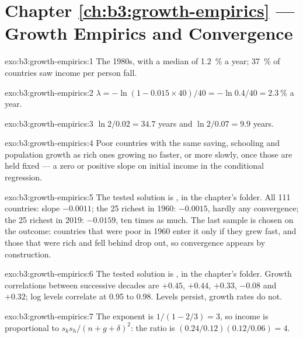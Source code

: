 \section*{Chapter \ref{ch:b3:growth-empirics} --- Growth Empirics and Convergence}

\begin{solution}{exo:b3:growth-empirics:1}
The 1980s, with a median of 1.2~\% a year; 37~\% of countries saw income per person fall. %
\end{solution}

\begin{solution}{exo:b3:growth-empirics:2}
$\lambda = -\ln(1 - 0.015 \times 40)/40 = -\ln 0.4/40 = 2.3~\%$ a year.
\end{solution}

\begin{solution}{exo:b3:growth-empirics:3}
$\ln 2/0.02 = 34.7$ years and $\ln 2/0.07 = 9.9$ years.
\end{solution}

\begin{solution}{exo:b3:growth-empirics:4}
Poor countries with the same saving, schooling and population growth as rich ones
growing no faster, or more slowly, once those are held fixed --- a zero or positive
slope on initial income in the conditional regression.
\end{solution}

\begin{solution}{exo:b3:growth-empirics:5}
The tested solution is , in the chapter's 
folder. All 111 countries: slope $-0.0011$; the 25 richest in 1960: $-0.0015$, hardly any
convergence; the 25 richest in 2019: $-0.0159$, ten times as much. The last sample is chosen on the outcome: countries that were poor in 1960
enter it only if they grew fast, and those that were rich and fell behind drop out,
so convergence appears by construction.
\end{solution}

\begin{solution}{exo:b3:growth-empirics:6}
The tested solution is , in the chapter's 
folder. Growth correlations between successive decades are $+0.45$, $+0.44$, $+0.33$, $-0.08$ and $+0.32$;
log levels correlate at 0.95 to 0.98. Levels persist, growth rates do not.
\end{solution}

\begin{solution}{exo:b3:growth-empirics:7}
The exponent is $1/(1 - 2/3) = 3$, so income is proportional to $s_k s_h/(n + g + \delta)^2$: the ratio is
$(0.24/0.12)(0.12/0.06) = 4$.
\end{solution}

